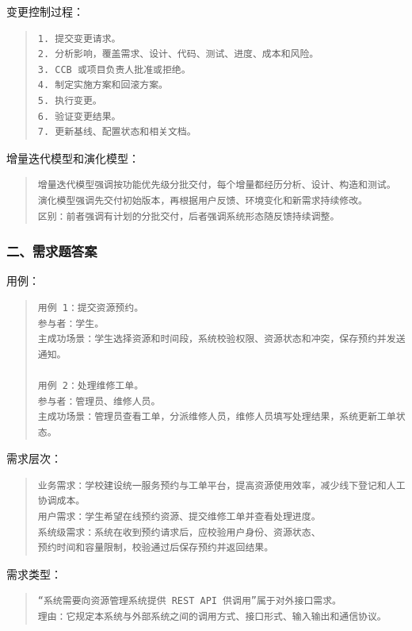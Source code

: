 \documentclass[UTF8,zihao=-4]{ctexart}
\begin{document}
变更控制过程：


\begin{quote}
\footnotesize
\begin{verbatim}
1. 提交变更请求。
2. 分析影响，覆盖需求、设计、代码、测试、进度、成本和风险。
3. CCB 或项目负责人批准或拒绝。
4. 制定实施方案和回滚方案。
5. 执行变更。
6. 验证变更结果。
7. 更新基线、配置状态和相关文档。
\end{verbatim}
\end{quote}


增量迭代模型和演化模型：


\begin{quote}
\footnotesize
\begin{verbatim}
增量迭代模型强调按功能优先级分批交付，每个增量都经历分析、设计、构造和测试。
演化模型强调先交付初始版本，再根据用户反馈、环境变化和新需求持续修改。
区别：前者强调有计划的分批交付，后者强调系统形态随反馈持续调整。
\end{verbatim}
\end{quote}


\subsubsection*{二、需求题答案}


用例：


\begin{quote}
\footnotesize
\begin{verbatim}
用例 1：提交资源预约。
参与者：学生。
主成功场景：学生选择资源和时间段，系统校验权限、资源状态和冲突，保存预约并发送通知。

用例 2：处理维修工单。
参与者：管理员、维修人员。
主成功场景：管理员查看工单，分派维修人员，维修人员填写处理结果，系统更新工单状态。
\end{verbatim}
\end{quote}


需求层次：


\begin{quote}
\footnotesize
\begin{verbatim}
业务需求：学校建设统一服务预约与工单平台，提高资源使用效率，减少线下登记和人工协调成本。
用户需求：学生希望在线预约资源、提交维修工单并查看处理进度。
系统级需求：系统在收到预约请求后，应校验用户身份、资源状态、
预约时间和容量限制，校验通过后保存预约并返回结果。
\end{verbatim}
\end{quote}


需求类型：


\begin{quote}
\footnotesize
\begin{verbatim}
“系统需要向资源管理系统提供 REST API 供调用”属于对外接口需求。
理由：它规定本系统与外部系统之间的调用方式、接口形式、输入输出和通信协议。
\end{verbatim}
\end{quote}
\end{document}
